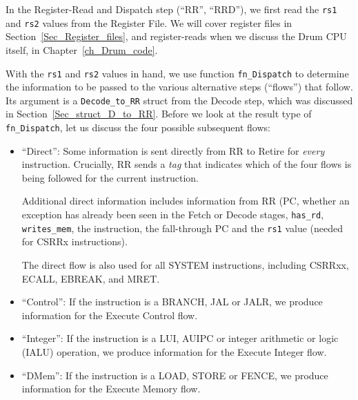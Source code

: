 
In the Register-Read and Dispatch step (``RR'', ``RRD''), we first
read the \verb|rs1| and \verb|rs2| values from the Register File.  We
will cover register files in Section~\ref{Sec_Register_files}, and
register-reads when we discuss the Drum CPU itself, in
Chapter~\ref{ch_Drum_code}.

With the \verb|rs1| and \verb|rs2| values in hand, we use function
\verb|fn_Dispatch| to determine the information to be passed to the
various alternative steps (``flows'') that follow.  Its argument is a
\verb|Decode_to_RR| struct from the Decode step, which was discussed
in Section~\ref{Sec_struct_D_to_RR}.  Before we look at the result
type of \verb|fn_Dispatch|, let us discuss the four possible
subsequent flows:

\begin{itemize}

  \item ``Direct'': Some information is sent directly from RR to
        Retire for \emph{every} instruction.  Crucially, RR sends a
        \emph{tag} that indicates which of the four flows is being
        followed for the current instruction.

        Additional direct information includes information from RR
        (PC, whether an exception has already been seen in the Fetch
        or Decode stages, \verb|has_rd|, \verb|writes_mem|, the
        instruction, the fall-through PC and the \verb|rs1| value
        (needed for CSRRx instructions).

       The direct flow is also used for all SYSTEM instructions,
       including CSRRxx, ECALL, EBREAK, and MRET.

  \item ``Control'': If the instruction is a BRANCH, JAL or JALR, we
        produce information for the Execute Control flow.

  \item ``Integer'': If the instruction is a LUI, AUIPC or integer
        arithmetic or logic (IALU) operation, we produce information
        for the Execute Integer flow.

  \item ``DMem'': If the instruction is a LOAD, STORE or FENCE, we
        produce information for the Execute Memory flow.

\end{itemize}

